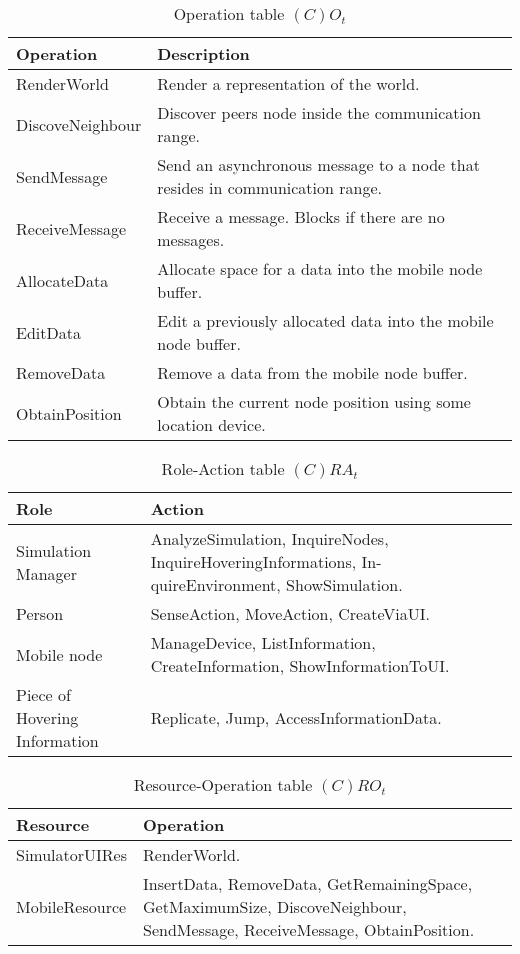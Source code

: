 \begin{table}[H]
	\centering
	\begin{tabular}{|p{4cm}|p{8cm}|}
			\hline
			\textbf{Operation} & \textbf{Description} \\
			\hline
			RenderWorld & Render a representation of the world. \\
			\hline
			DiscoveNeighbour & Discover peers node inside the communication range. \\
			\hline
      SendMessage & Send an asynchronous message to a node that resides in
      communication range. \\
			\hline
      ReceiveMessage & Receive a message. Blocks if there are no messages. \\
			\hline
			AllocateData & Allocate space for a data into the mobile node buffer. \\
			\hline
			EditData & Edit a previously allocated data into the mobile node buffer. \\
			\hline
			RemoveData & Remove a data from the mobile node buffer. \\
			\hline
			ObtainPosition & Obtain the current node position using some location
			device. \\
			\hline
		\end{tabular}
	\caption{Operation table $(C)O_t$}
	\label{tab:cot}
\end{table}

\begin{table}[H]
	\centering
	\begin{tabular}{|p{4cm}|p{8cm}|}
			\hline
			\textbf{Role} & \textbf{Action} \\
			\hline
			Simulation Manager & AnalyzeSimulation, InquireNodes, InquireHoveringInformations, In-
			quireEnvironment, ShowSimulation. \\
			\hline
			Person & SenseAction, MoveAction, CreateViaUI. \\
			\hline
			Mobile node & ManageDevice, ListInformation, CreateInformation, ShowInformationToUI.  \\
			\hline
			Piece of Hovering Information & Replicate, Jump, AccessInformationData. \\
			\hline
		\end{tabular}
	\caption{Role-Action table $(C)RA_t$}
	\label{tab:rat}
\end{table}

\begin{table}[H]
	\centering
	\begin{tabular}{|p{4cm}|p{8cm}|}
			\hline
			\textbf{Resource} & \textbf{Operation} \\
			\hline
			SimulatorUIRes & RenderWorld. \\
			\hline
			MobileResource & InsertData, RemoveData, GetRemainingSpace,
			GetMaximumSize, DiscoveNeighbour, SendMessage, ReceiveMessage, ObtainPosition. \\
			\hline
		\end{tabular}
	\caption{Resource-Operation table $(C)RO_t$}
	\label{tab:crot}
\end{table}

